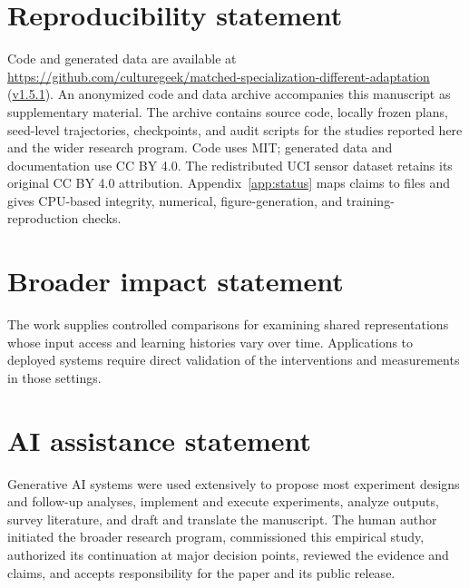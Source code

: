 \section*{Reproducibility statement}
\ifpublicrelease
Code and generated data are available at \url{https://github.com/culturegeek/matched-specialization-different-adaptation} (\href{https://github.com/culturegeek/matched-specialization-different-adaptation/releases/tag/v1.5.1}{v1.5.1}).
\else
An anonymized code and data archive accompanies this manuscript as supplementary material.
\fi
The archive contains source code, locally frozen plans, seed-level trajectories, checkpoints, and audit scripts for the studies reported here and the wider research program. Code uses MIT; generated data and documentation use CC BY 4.0. The redistributed UCI sensor dataset retains its original CC BY 4.0 attribution. Appendix~\ref{app:status} maps claims to files and gives CPU-based integrity, numerical, figure-generation, and training-reproduction checks.

\section*{Broader impact statement}
The work supplies controlled comparisons for examining shared representations whose input access and learning histories vary over time. Applications to deployed systems require direct validation of the interventions and measurements in those settings.

\section*{AI assistance statement}
Generative AI systems were used extensively to propose most experiment designs and follow-up analyses, implement and execute experiments, analyze outputs, survey literature, and draft and translate the manuscript. The human author initiated the broader research program, commissioned this empirical study, authorized its continuation at major decision points, reviewed the evidence and claims, and accepts responsibility for the paper and its public release.



\FloatBarrier
\appendix


